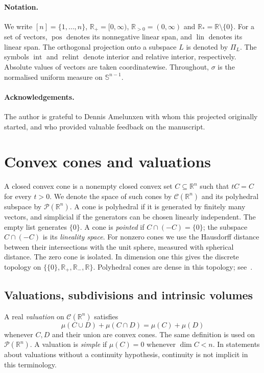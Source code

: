 \documentclass[11pt]{article}
\DeclareMathOperator{\pos}{pos}
\newcommand{\R}{\mathbb{R}}
\newcommand{\PP}{\mathcal P}
\newcommand{\CC}{\mathcal{C}}
\newcommand{\sphere}[1]{\mathbb{S}^{#1}}
\newcommand{\lin}{\operatorname{lin}}
\DeclareMathOperator{\inter}{int}
\DeclareMathOperator{\relint}{relint}
\begin{document}
\paragraph{Notation.}
We write $[n]=\{1,\ldots,n\}$, $\R_+=[0,\infty)$, $\R_{>0}=(0,\infty)$ and
$\R_*=\R\setminus\{0\}$. For a set of vectors, $\pos$ denotes
its nonnegative linear span, and $\lin$ denotes its linear span.
The orthogonal projection onto a subspace $L$ is denoted by $\Pi_L$. 
The symbols $\inter$ and $\relint$ denote interior and relative
interior, respectively. Absolute values of vectors are taken coordinatewise.
Throughout, $\sigma$ is the normalised uniform measure on $\sphere{n-1}$.

\paragraph{Acknowledgements.} The author is grateful to Dennis Amelunxen with whom this projected
originally started, and who provided valuable feedback on the manuscript. 

\section{Convex cones and valuations}\label{sec:cones}
A closed convex cone is a nonempty closed convex set $C\subseteq\R^n$
such that $tC=C$ for every $t>0$. We denote the
space of such cones by $\CC(\R^n)$ and its polyhedral subspace by
$\PP(\R^n)$. A cone is polyhedral if it is generated by finitely many
vectors, and simplicial if the generators can be chosen linearly
independent. The empty list generates $\{0\}$.
A cone is \emph{pointed} if $C\cap(-C)=\{0\}$; the
subspace $C\cap(-C)$ is its \emph{lineality space}. For nonzero cones
we use the Hausdorff distance between their intersections with the unit
sphere, measured with spherical distance. The zero cone is isolated.
In dimension one this gives the discrete topology on
$\{\{0\},\R_+,\R_-,\R\}$. Polyhedral cones are dense in this topology;
see~\cite[Chapter~3]{Sch22:Convex-Cones}.

\subsection{Valuations, subdivisions and intrinsic volumes}
A real \emph{valuation} on $\CC(\R^n)$ satisfies
\[
 \mu(C\cup D)+\mu(C\cap D)=\mu(C)+\mu(D)
\]
whenever $C,D$ and their union are convex cones. The same definition is
used on $\PP(\R^n)$. A valuation is \emph{simple} if $\mu(C)=0$ whenever
$\dim C<n$. In statements about valuations without a continuity
hypothesis, continuity is not implicit in this terminology.
\end{document}
